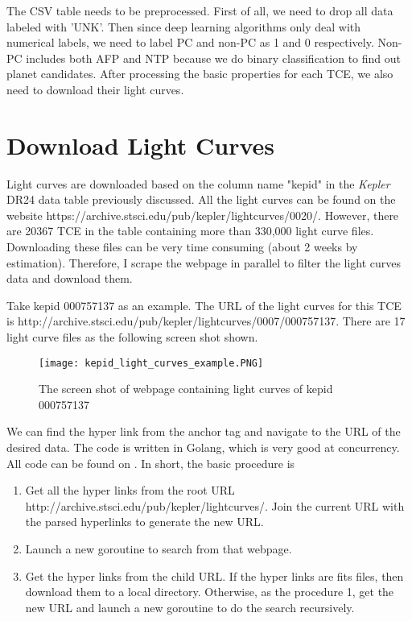   The CSV table needs to be preprocessed. First of all, we need to drop all data labeled with 
  'UNK'. Then since deep learning algorithms only deal with numerical labels, we need to 
  label PC and non-PC as 1 and 0 respectively. Non-PC includes both AFP and NTP because we do 
  binary classification to find out planet candidates. After processing the basic properties 
  for each TCE, we also need to download their light curves.

  \section{Download Light Curves}
    Light curves are downloaded based on the column name "kepid" in the \textit{Kepler} DR24 
    data table previously discussed. All the light curves can be found on the website 
    {https://archive.stsci.edu/pub/kepler/lightcurves/0020/}. However, there are 20367 TCE
    in the table containing more than 330,000 light curve files. Downloading these 
    files can be very time consuming (about 2 weeks by estimation). Therefore, I scrape the 
    webpage in parallel to filter the light curves data and download them. 

    Take kepid 000757137 as an example. The URL of the light curves for this TCE is 
    {http://archive.stsci.edu/pub/kepler/lightcurves/0007/000757137}. There are 17 light 
    curve files as the following screen shot shown.
    \begin{figure}[!htp]
      \centering
      \texttt{[image: kepid\_light\_curves\_example.PNG]}
      \caption{The screen shot of webpage containing light curves of kepid 000757137}
      \label{fig: kepid_light_curves_example}
    \end{figure}

    We can find the hyper link from the anchor tag and navigate to the URL of the desired 
    data. The code is written in Golang, which is very good at concurrency. All code can be 
    found on .
    In short, the basic procedure is 
    \begin{enumerate}
      \item Get all the hyper links from the root URL 
        {http://archive.stsci.edu/pub/kepler/lightcurves/}. Join the current URL with 
        the parsed hyperlinks to generate the new URL. 
      \item Launch a new goroutine to search from that webpage.
      \item Get the hyper links from the child URL. If the hyper links are fits files, then 
        download them to a local directory. Otherwise, as the procedure 1, get the new 
        URL and launch a new goroutine to do the search recursively.
    \end{enumerate}
  